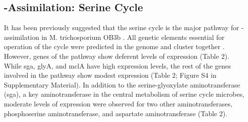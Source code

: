 \subsection{-Assimilation: Serine Cycle}
It has been previously suggested that the serine cycle is the major pathway for -assimilation in M. trichosporium OB3b \cite{strom1974}.
All genetic elements essential for operation of the cycle were predicted in the genome and cluster together \cite{stein2010}.
However, genes of the pathway show deferent levels of expression (Table 2).
While sga, glyA, and mclA have high expression levels, the rest of the genes involved in the pathway show modest expression (Table 2; Figure S4 in Supplementary Material).
In addition to the serine-glyoxylate aminotransferase (sga), a key aminotransferase in the central metabolism of serine cycle microbes, moderate levels of expression were observed for two other aminotransferases, phosphoserine aminotransferase, and aspartate aminotransferase (Table 2).

